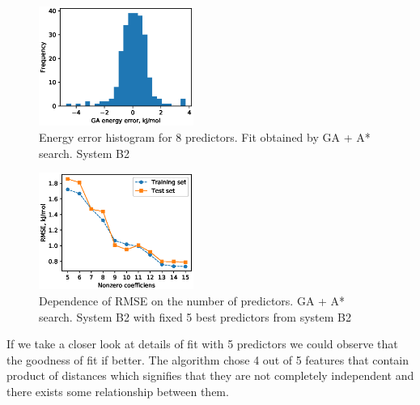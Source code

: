 \documentclass[aps,prl,reprint,amsmath,amssymb,nature]{revtex4-1}
\begin{document}
\begin{figure}
\includegraphics[width=0.45\textwidth]{media/B2_GA_energy_error_histogram_8_predictors.eps}
\caption{Energy error histogram for 8 predictors. Fit obtained by GA + A* search. System B2}\label{Fig:B2_histogram_8_predictors}
\end{figure}

\begin{figure}
\includegraphics[width=0.45\textwidth]{media/B2_VIP_GA_PATH_RMSE.eps}
\caption{Dependence of RMSE on the number of predictors. GA + A* search. System B2 with fixed 5 best predictors from system B2}\label{Fig:B2_VIP_RMSE}
\end{figure}


If we take a closer look at details of fit 
with 5 predictors we could observe that the goodness of fit if better. 
The algorithm chose 4 out of 5 features that contain product of 
distances which signifies that they are not completely independent and 
there exists some relationship between them.
\end{document}
